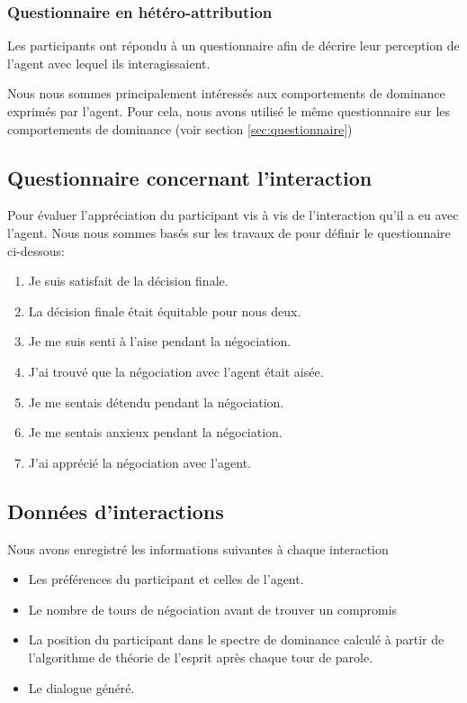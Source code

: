 \subsubsection{Questionnaire en hétéro-attribution}
Les participants ont répondu à un questionnaire afin de décrire leur perception de l’agent avec lequel ils interagissaient.

Nous nous sommes principalement intéressés aux comportements de dominance exprimés par l'agent. Pour cela, nous avons utilisé le même questionnaire sur les comportements de dominance (voir section \ref{sec:questionnaire})

\subsection{Questionnaire concernant l'interaction}
Pour évaluer l'appréciation du participant vis à vis de l'interaction qu'il a eu avec l'agent. Nous nous sommes basés sur les travaux de \cite{tiedens2003power,wiltermuth2009benefits,olekalns2013dyadic} pour définir le questionnaire ci-dessous:

\begin{enumerate}
	\item Je suis satisfait de la décision finale.
	\item La décision finale était équitable pour nous deux.
	\item Je me suis senti à l'aise pendant la négociation.
	\item J'ai trouvé que la négociation avec l'agent était aisée.
	\item Je me sentais détendu pendant la négociation.
	\item Je me sentais anxieux pendant la négociation.
	\item J'ai apprécié la négociation avec l'agent.
\end{enumerate}

\subsection{Données d'interactions}
Nous avons enregistré les informations suivantes à chaque interaction
\begin{itemize}
	\item Les préférences du participant et celles de l'agent.
	\item Le nombre de tours de négociation avant de trouver un compromis
	\item La position du participant dans le spectre de dominance calculé à partir de l'algorithme de théorie de l'esprit après chaque tour de parole.
	\item Le dialogue généré.
	
\end{itemize}


